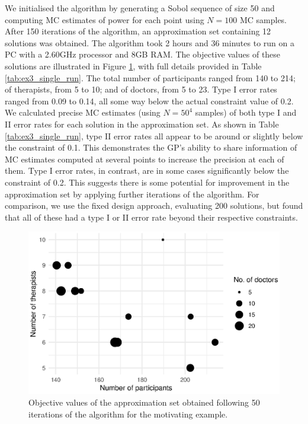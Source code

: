 \documentclass[sagev, Crown]{sagej}
\begin{document}
We initialised the algorithm by generating a Sobol sequence of size 50 and computing MC estimates of power for each point using $N = 100$ MC samples. After 150 iterations of the algorithm, an approximation set containing 12 solutions was obtained. The algorithm took 2 hours and 36 minutes to run on a PC with a 2.60GHz processor and 8GB RAM. The objective values of these solutions are illustrated in Figure \ref{fig:ex3_single_run}, with full details provided in Table \ref{tab:ex3_single_run}. The total number of participants ranged from 140 to 214; of therapists, from 5 to 10; and of doctors, from 5 to 23. Type I error rates ranged from 0.09 to 0.14, all some way below the actual constraint value of 0.2. We calculated precise MC estimates (using $N = 50^4$ samples) of both type I and II error rates for each solution in the approximation set. As shown in Table \ref{tab:ex3_single_run}, type II error rates all appear to be around or slightly below the constraint of 0.1. This demonstrates the GP's ability to share information of MC estimates computed at several points to increase the precision at each of them. Type I error rates, in contrast, are in some cases significantly below the constraint of 0.2. This suggests there is some potential for improvement in the approximation set by applying further iterations of the algorithm. For comparison, we use the fixed design approach, evaluating 200 solutions, but found that all of these had a type I or II error rate beyond their respective constraints.

\begin{figure}
\centering
\includegraphics[scale=0.8]{./figures/ex3_single_run.eps}
\caption{Objective values of the approximation set obtained following 50 iterations of the algorithm for the motivating example.}
\label{fig:ex3_single_run}
\end{figure}
\end{document}
